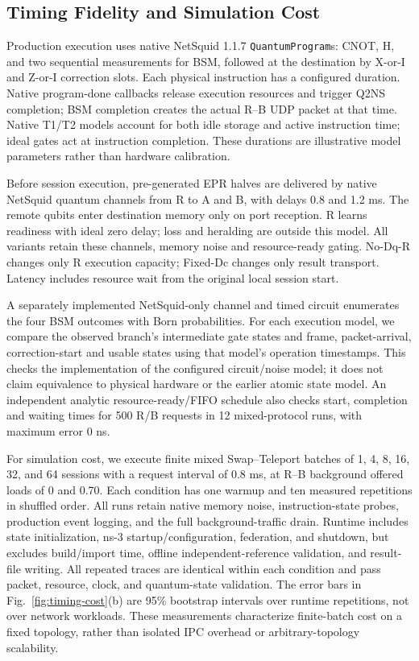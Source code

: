 \subsection{Timing Fidelity and Simulation Cost}
Production execution uses native NetSquid 1.1.7 \texttt{QuantumProgram}s:
CNOT, H, and two sequential measurements for BSM, followed at the destination
by X-or-I and Z-or-I correction slots. Each physical instruction has a configured
duration. Native program-done callbacks release execution resources and trigger
Q2NS completion; BSM completion creates the actual R--B UDP packet at that time.
Native T1/T2 models account for both idle storage and active instruction time;
ideal gates act at instruction completion. These durations are illustrative
model parameters rather than hardware calibration.

Before session execution, pre-generated EPR halves are delivered by native
NetSquid quantum channels from R to A and B, with delays 0.8 and 1.2 ms.
The remote qubits enter destination memory only on port reception. R learns
readiness with ideal zero delay; loss and heralding are outside this model.
All variants retain these channels, memory noise and resource-ready gating.
No-Dq-R changes only R execution capacity; Fixed-Dc changes only result transport.
Latency includes resource wait from the original local session start.

A separately implemented NetSquid-only channel and timed circuit enumerates the four BSM
outcomes with Born probabilities. For each execution model, we compare the
observed branch's intermediate gate states and frame, packet-arrival,
correction-start and usable states using that model's operation timestamps.
This checks the implementation of the configured circuit/noise model; it does
not claim equivalence to physical hardware or the earlier atomic state model.
An independent analytic resource-ready/FIFO schedule also checks start, completion and waiting
times for 500 R/B requests in 12 mixed-protocol runs, with maximum error 0 ns.

For simulation cost, we execute finite mixed Swap--Teleport batches of
1, 4, 8, 16, 32, and 64 sessions with a request interval of 0.8 ms, at
R--B background offered loads of 0 and 0.70. Each condition has one warmup
and ten measured repetitions in shuffled order. All runs retain native memory
noise, instruction-state probes, production event logging, and the full background-traffic drain.
Runtime includes state initialization, ns-3 startup/configuration, federation,
and shutdown, but excludes build/import time, offline independent-reference
validation, and result-file writing. All repeated traces are identical within
each condition and pass packet, resource, clock, and quantum-state validation.
The error bars in Fig.~\ref{fig:timing-cost}(b) are 95\% bootstrap intervals
over runtime repetitions, not over network workloads. These measurements
characterize finite-batch cost on a fixed topology, rather than isolated IPC
overhead or arbitrary-topology scalability.

